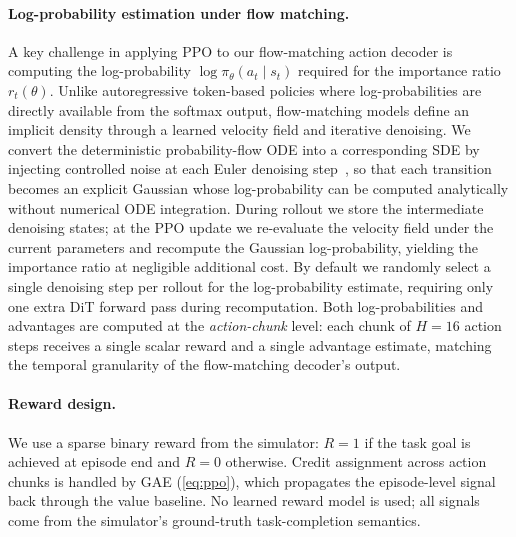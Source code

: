 \documentclass{article}
\begin{document}
\paragraph{Log-probability estimation under flow matching.}
A key challenge in applying PPO to our flow-matching action decoder is computing the log-probability $\log\pi_\theta(a_t \mid s_t)$ required for the importance ratio $r_t(\theta)$.
Unlike autoregressive token-based policies where log-probabilities are directly available from the softmax output, flow-matching models define an implicit density through a learned velocity field and iterative denoising.
We convert the deterministic probability-flow ODE into a corresponding SDE by injecting controlled noise at each Euler denoising step~\citep{song2021score}, so that each transition becomes an explicit Gaussian whose log-probability can be computed analytically without numerical ODE integration.
During rollout we store the intermediate denoising states; at the PPO update we re-evaluate the velocity field under the current parameters and recompute the Gaussian log-probability, yielding the importance ratio at negligible additional cost.
By default we randomly select a single denoising step per rollout for the log-probability estimate, requiring only one extra DiT forward pass during recomputation.
Both log-probabilities and advantages are computed at the \emph{action-chunk} level: each chunk of $H{=}16$ action steps receives a single scalar reward and a single advantage estimate, matching the temporal granularity of the flow-matching decoder's output.

\paragraph{Reward design.}
We use a sparse binary reward from the simulator: $R{=}1$ if the task goal is achieved at episode end and $R{=}0$ otherwise.
Credit assignment across action chunks is handled by GAE (\cref{eq:ppo}), which propagates the episode-level signal back through the value baseline.
No learned reward model is used; all signals come from the simulator's ground-truth task-completion semantics.
\end{document}
